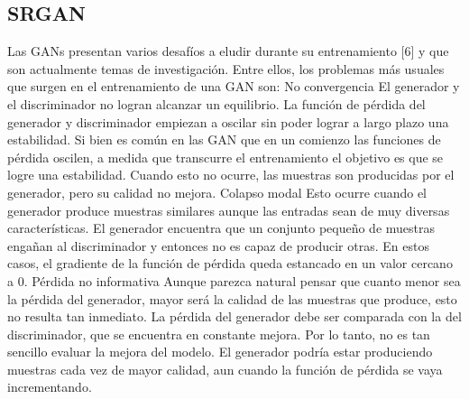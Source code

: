\subsection{SRGAN}
Las GANs presentan varios desafíos a eludir durante su entrenamiento [6] y
que son actualmente temas de investigación. Entre ellos, los problemas más
usuales que surgen en el entrenamiento de una GAN son:
No convergencia
El generador y el discriminador no logran alcanzar un equilibrio. La
función de pérdida del generador y discriminador empiezan a oscilar sin
poder lograr a largo plazo una estabilidad.
Si bien es común en las GAN que en un comienzo las funciones de pérdida
oscilen, a medida que transcurre el entrenamiento el objetivo es que se
logre una estabilidad. Cuando esto no ocurre, las muestras son producidas
por el generador, pero su calidad no mejora.
Colapso modal
Esto ocurre cuando el generador produce muestras similares aunque las
entradas sean de muy diversas características. El generador encuentra que
un conjunto pequeño de muestras engañan al discriminador y entonces
no es capaz de producir otras. En estos casos, el gradiente de la función
de pérdida queda estancado en un valor cercano a 0.
Pérdida no informativa
Aunque parezca natural pensar que cuanto menor sea la pérdida del
generador, mayor será la calidad de las muestras que produce, esto no
resulta tan inmediato. La pérdida del generador debe ser comparada con
la del discriminador, que se encuentra en constante mejora. Por lo tanto,
no es tan sencillo evaluar la mejora del modelo. El generador podría estar
produciendo muestras cada vez de mayor calidad, aun cuando la función
de pérdida se vaya incrementando.
